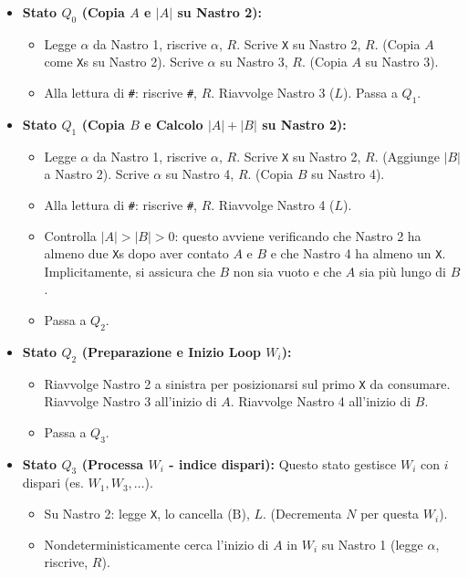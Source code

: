 \documentclass[a4paper, 11pt]{book} %
\theoremstyle{definition}
\newcommand{\B}{\text{B}} %
\begin{document}
\begin{itemize}
    \item \textbf{Stato $Q_0$ (Copia $A$ e $|A|$ su Nastro 2):}
        \begin{itemize}
            \item Legge $\alpha$ da Nastro 1, riscrive $\alpha$, $R$. Scrive \texttt{X} su Nastro 2, $R$. (Copia $A$ come \texttt{X}s su Nastro 2). Scrive $\alpha$ su Nastro 3, $R$. (Copia $A$ su Nastro 3).
            \item Alla lettura di \texttt{\#}: riscrive \texttt{\#}, $R$. Riavvolge Nastro 3 ($L$). Passa a $Q_1$.
        \end{itemize}
    \item \textbf{Stato $Q_1$ (Copia $B$ e Calcolo $|A|+|B|$ su Nastro 2):}
        \begin{itemize}
            \item Legge $\alpha$ da Nastro 1, riscrive $\alpha$, $R$. Scrive \texttt{X} su Nastro 2, $R$. (Aggiunge $|B|$ a Nastro 2). Scrive $\alpha$ su Nastro 4, $R$. (Copia $B$ su Nastro 4).
            \item Alla lettura di \texttt{\#}: riscrive \texttt{\#}, $R$. Riavvolge Nastro 4 ($L$).
            \item Controlla $|A|>|B|>0$: questo avviene verificando che Nastro 2 ha almeno due \texttt{X}s dopo aver contato $A$ e $B$ e che Nastro 4 ha almeno un \texttt{X}. Implicitamente, si assicura che $B$ non sia vuoto e che $A$ sia più lungo di $B$.
            \item Passa a $Q_2$.
        \end{itemize}
    \item \textbf{Stato $Q_2$ (Preparazione e Inizio Loop $W_i$):}
        \begin{itemize}
            \item Riavvolge Nastro 2 a sinistra per posizionarsi sul primo \texttt{X} da consumare. Riavvolge Nastro 3 all'inizio di $A$. Riavvolge Nastro 4 all'inizio di $B$.
            \item Passa a $Q_3$.
        \end{itemize}
    \item \textbf{Stato $Q_3$ (Processa $W_i$ - indice dispari):}
        Questo stato gestisce $W_i$ con $i$ dispari (es. $W_1, W_3, \dots$).
        \begin{itemize}
            \item Su Nastro 2: legge \texttt{X}, lo cancella ($\B$), $L$. (Decrementa $N$ per questa $W_i$).
            \item Nondeterministicamente cerca l'inizio di $A$ in $W_i$ su Nastro 1 (legge $\alpha$, riscrive, $R$).

\end{itemize}
\end{itemize}
\end{document}
